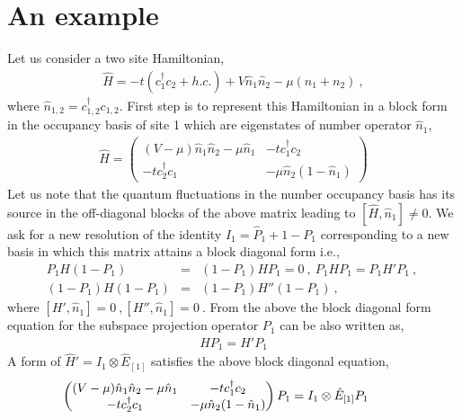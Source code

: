 \documentclass[12pt,a4paper]{article}
\begin{document}
\section{An example}
Let us consider a two site Hamiltonian,
\begin{eqnarray}
\hat{H} = -t(c^{\dagger}_{1}c_{2}+h.c.)+V\hat{n}_{1}\hat{n}_{2}-\mu(n_{1}+n_{2})~,
\end{eqnarray}
where $\hat{n}_{1,2}=c^{\dagger}_{1,2}c_{1,2}$.
First step is to represent this Hamiltonian in a block form in the occupancy basis of site 1 which are eigenstates of number operator $\hat{n}_{1}$,
\begin{eqnarray}
\hat{H} = 
\begin{pmatrix}
			(V-\mu)\hat{n}_{1}\hat{n}_{2}-\mu\hat{n}_{1}							 & -tc^{\dagger}_{1}c_{2}\\
				-tc^{\dagger}_{2}c_{1}						& -\mu\hat{n}_{2}(1-\hat{n}_{1})
											\end{pmatrix}\label{block_matrix}
\end{eqnarray}
Let us note that the quantum fluctuations in the number occupancy basis has its source in the off-diagonal blocks of the above matrix leading to $[\hat{H},\hat{n}_{1}]\neq 0$. We ask for a new resolution of the identity $I_{1}=\hat{P}_{1}+1-P_{1}$ corresponding to a new basis in which this matrix attains a block diagonal form i.e.,
\begin{eqnarray}
P_{1}H(1-P_{1})&=&(1-P_{1})HP_{1}=0~,~P_{1}HP_{1} = P_{1}H'P_{1}~,~\nonumber\\
 (1-P_{1})H(1-P_{1}) &=& (1-P_{1})H''(1-P_{1})~,~\nonumber
\end{eqnarray}
where $[H',\hat{n}_{1}]=0~,[H'',\hat{n}_{1}]=0~$. From the above the block diagonal form equation for the subspace projection operator $P_{1}$ can be also written as,
\begin{eqnarray}
HP_{1} = H'P_{1}
\end{eqnarray}
 A form of $\hat{H}'=I_{1}\otimes\hat{E}_{[1]} $ satisfies the above block diagonal equation,
\begin{eqnarray}
\hspace*{-1cm}
\begin{pmatrix}
			(V-\mu)\hat{n}_{1}\hat{n}_{2}-\mu\hat{n}_{1}							 & -tc^{\dagger}_{1}c_{2}\\
				-tc^{\dagger}_{2}c_{1}						& -\mu\hat{n}_{2}(1-\hat{n}_{1})
											\end{pmatrix}P_{1}= I_{1}\otimes\hat{E}_{[1]}P_{1}\label{block_diagonal_eqn}
\end{eqnarray}
\end{document}
